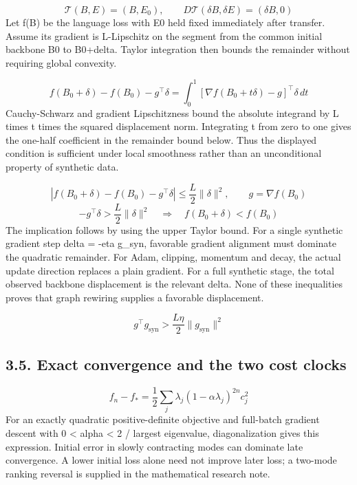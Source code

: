\documentclass[11pt,a4paper]{article}
\begin{document}
\begin{equation}
\mathcal{T}(B,E)=(B,E_0),\qquad D\mathcal{T}(\delta B,\delta E)=(\delta B,0)
\end{equation}
Let f(B) be the language loss with E0 held fixed immediately after transfer. Assume its gradient is L-Lipschitz on the segment from the common initial backbone B0 to B0+delta. Taylor integration then bounds the remainder without requiring global convexity.

\begin{equation}
f(B_0+\delta)-f(B_0)-g^\top\delta=\int_0^1[\nabla f(B_0+t\delta)-g]^\top\delta\,dt
\end{equation}
Cauchy-Schwarz and gradient Lipschitzness bound the absolute integrand by L times t times the squared displacement norm. Integrating t from zero to one gives the one-half coefficient in the remainder bound below. Thus the displayed condition is sufficient under local smoothness rather than an unconditional property of synthetic data.

\begin{equation}
|f(B_0+\delta)-f(B_0)-g^\top\delta|\leq\frac{L}{2}\|\delta\|^2,\qquad g=\nabla f(B_0)
\end{equation}
\begin{equation}
-g^\top\delta>\frac{L}{2}\|\delta\|^2\quad\Longrightarrow\quad f(B_0+\delta)<f(B_0)
\end{equation}
The implication follows by using the upper Taylor bound. For a single synthetic gradient step delta = -eta g\_\allowbreak{}syn, favorable gradient alignment must dominate the quadratic remainder. For Adam, clipping, momentum and decay, the actual update direction replaces a plain gradient. For a full synthetic stage, the total observed backbone displacement is the relevant delta. None of these inequalities proves that graph rewiring supplies a favorable displacement.

\begin{equation}
g^\top g_{\mathrm{syn}}>\frac{L\eta}{2}\|g_{\mathrm{syn}}\|^2
\end{equation}
\subsection*{3.5. Exact convergence and the two cost clocks}
\begin{equation}
f_n-f_* =\frac{1}{2}\sum_j\lambda_j(1-\alpha\lambda_j)^{2n}c_j^2
\end{equation}
For an exactly quadratic positive-definite objective and full-batch gradient descent with 0 < alpha < 2 /\allowbreak{} largest eigenvalue, diagonalization gives this expression. Initial error in slowly contracting modes can dominate late convergence. A lower initial loss alone need not improve later loss; a two-mode ranking reversal is supplied in the mathematical research note.
\end{document}
